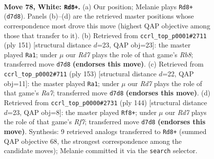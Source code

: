 \documentclass[11pt]{article}
\begin{document}
\clearpage

\begin{figure}[p]\centering
\begin{subfigure}{0.46\textwidth}\centering
\resizebox{\linewidth}{!}{%
\newchessgame
\chessboard[
  setfen={7k/3R4/8/8/p1p5/PrP4p/7P/6K1 w - - 6 78},
  showmover=false,
  pgfstyle=straightmove, color=movearrow, markmove={d7-d8}
]}
\caption{}
\end{subfigure}\hfill
\begin{subfigure}{0.46\textwidth}\centering
\resizebox{\linewidth}{!}{%
\newchessgame
\chessboard[
  setfen={8/8/4k3/2Rp1p2/3P1P2/4P3/4K3/1r6 b - - 28 76},
  showmover=false,
  pgfstyle=straightmove, color=movearrow, markmove={b1-a1}
]}
\caption{}
\end{subfigure}
\\[4pt]
\begin{subfigure}{0.46\textwidth}\centering
\resizebox{\linewidth}{!}{%
\newchessgame
\chessboard[
  setfen={8/5pk1/8/5PP1/3R1p2/5K2/r7/8 b - - 2 77},
  showmover=false,
  pgfstyle=straightmove, color=movearrow, markmove={a2-a1}
]}
\caption{}
\end{subfigure}\hfill
\begin{subfigure}{0.46\textwidth}\centering
\resizebox{\linewidth}{!}{%
\newchessgame
\chessboard[
  setfen={k7/5R2/6p1/PK5p/4r2P/8/8/8 w - - 7 73},
  showmover=false,
  pgfstyle=straightmove, color=movearrow, markmove={f7-f8}
]}
\caption{}
\end{subfigure}
\caption{\textbf{Move 78, White: \texttt{Rd8+}.} (a) Our position; Melanie plays \texttt{Rd8+} (\texttt{d7d8}). Panels (b)--(d) are the retrieved master positions whose correspondence most drove this move (highest QAP objective among those that transfer to it). (b) Retrieved from \texttt{ccrl\_top\_p0001\#2711} (ply 151) [structural distance $d$=23, QAP obj=23]: the master played \texttt{Ra1}; under $\mu$ our \emph{Rd7} plays the role of that game's \emph{Rb8}; transferred move \texttt{d7d8} \textbf{(endorses this move)}. (c) Retrieved from \texttt{ccrl\_top\_p0002\#711} (ply 153) [structural distance $d$=22, QAP obj=11]: the master played \texttt{Ra1}; under $\mu$ our \emph{Rd7} plays the role of that game's \emph{Ra7}; transferred move \texttt{d7d8} \textbf{(endorses this move)}. (d) Retrieved from \texttt{ccrl\_top\_p0000\#2731} (ply 144) [structural distance $d$=23, QAP obj=8]: the master played \texttt{Rf8+}; under $\mu$ our \emph{Rd7} plays the role of that game's \emph{Rf7}; transferred move \texttt{d7d8} \textbf{(endorses this move)}. Synthesis: 9 retrieved analogs transferred to \texttt{Rd8+} (summed QAP objective 68, the strongest correspondence among the candidate moves); Melanie committed it via the \texttt{search} selector.}
\label{fig:thought-m154}
\end{figure}
\end{document}
